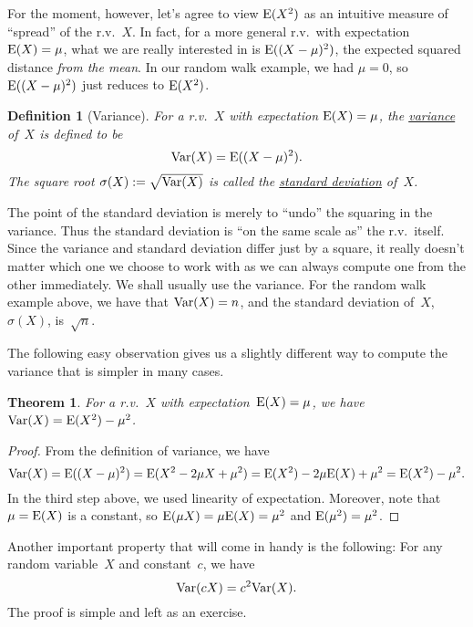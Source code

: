 \documentclass[11pt]{article}
\def\ul#1{\underline{#1}}
\def\Ex#1{{\rm E}(#1)}
\def\Var#1{{\rm Var}(#1)}
\newcounter{thm}
\newtheorem{theorem}{Theorem}[thm]
\newtheorem{definition}{Definition}[thm]
\begin{document}
For the moment, however, let's agree to view $\Ex{X^2}$ as an
intuitive measure of ``spread'' of the r.v.~$X$.  In fact, for a
more general r.v.\ with expectation $\Ex{X}=\mu$, what we are
really interested in is $\Ex{(X-\mu)^2}$, the expected squared distance
{\it from the mean}.  In our random walk example, we had $\mu=0$,
so $\Ex{(X-\mu)^2}$ just reduces to $\Ex{X^2}$.

\begin{definition}[Variance] For a r.v.~$X$ with expectation $\Ex{X}=\mu$,
the \ul{variance} of~$X$ is defined to be $$
   \Var{X}=\Ex{(X-\mu)^2}.  $$
The square root $\sigma(X) :=\sqrt{\Var{X}}$ is called the
\ul{standard deviation} of~$X$.
\end{definition}

The point of the standard deviation is merely to ``undo'' the
squaring in the variance.  Thus the standard deviation is ``on the
same scale as'' the r.v.\ itself.  Since the variance and standard
deviation differ just by a square, it really doesn't matter which
one we choose to work with as we can always compute one from the
other immediately. We shall usually use the variance.  For the
random walk example above, we have that $\Var{X}=n$, and the
standard deviation of~$X$, $\sigma(X)$,  is~$\sqrt{n}$.

The following easy observation gives us a slightly different
way to compute the variance that is simpler in many cases.
\begin{theorem}\label{thm:var}
For a r.v.~$X$ with expectation~$\Ex{X}=\mu$, we have
$\Var{X}=\Ex{X^2}-\mu^2$.
\end{theorem}

\begin{proof} From the definition of variance, we have $$
\Var{X}=\Ex{(X-\mu)^2}=\Ex{X^2-2\mu X+\mu^2}
                               =\Ex{X^2}-2\mu\Ex{X}+\mu^2
                               =\Ex{X^2}-\mu^2.  $$
In the third step above, we used linearity of expectation. Moreover, note that
$\mu = \Ex{X}$ is a constant, so $\Ex{\mu X} = \mu \Ex{X} = \mu^2$ and $\Ex{\mu^2} = \mu^2$.
\end{proof}

Another important property that will come in handy is the following: For any random variable~$X$ and constant~$c$, we have $$
   \Var{cX}=c^2\Var{X}.  $$
   The proof is simple and left as an exercise.
\end{document}
